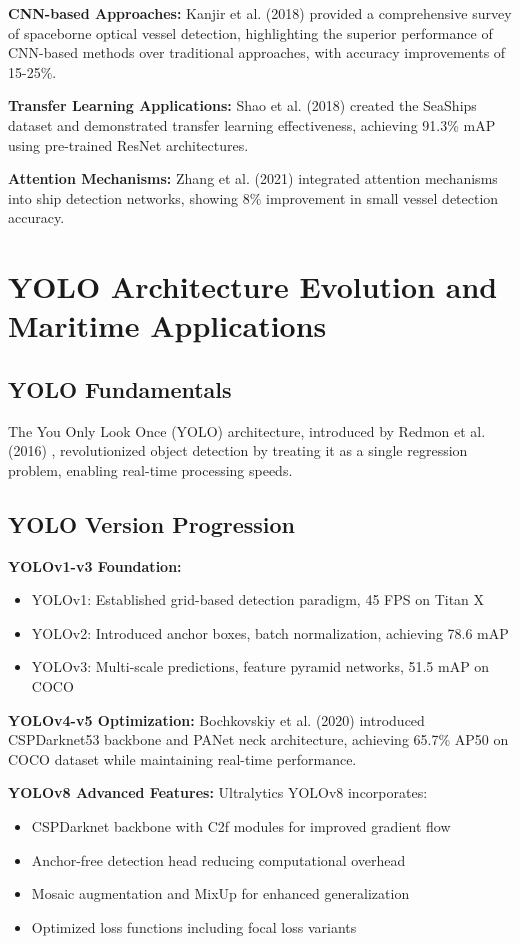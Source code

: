 \documentclass[12pt,a4paper]{report}
\begin{document}
\textbf{CNN-based Approaches:} Kanjir et al. (2018) \cite{kanjir2018vessel} provided a comprehensive survey of spaceborne optical vessel detection, highlighting the superior performance of CNN-based methods over traditional approaches, with accuracy improvements of 15-25\%.

\textbf{Transfer Learning Applications:} Shao et al. (2018) \cite{shao2018seaships} created the SeaShips dataset and demonstrated transfer learning effectiveness, achieving 91.3\% mAP using pre-trained ResNet architectures.

\textbf{Attention Mechanisms:} Zhang et al. (2021) \cite{zhang2021attention} integrated attention mechanisms into ship detection networks, showing 8\% improvement in small vessel detection accuracy.

\section{YOLO Architecture Evolution and Maritime Applications}

\subsection{YOLO Fundamentals}
The You Only Look Once (YOLO) architecture, introduced by Redmon et al. (2016) \cite{yolo_original}, revolutionized object detection by treating it as a single regression problem, enabling real-time processing speeds.

\subsection{YOLO Version Progression}

\textbf{YOLOv1-v3 Foundation:} 
\begin{itemize}
    \item YOLOv1: Established grid-based detection paradigm, 45 FPS on Titan X
    \item YOLOv2: Introduced anchor boxes, batch normalization, achieving 78.6 mAP
    \item YOLOv3: Multi-scale predictions, feature pyramid networks, 51.5 mAP on COCO
\end{itemize}

\textbf{YOLOv4-v5 Optimization:}
Bochkovskiy et al. (2020) \cite{bochkovskiy2020yolov4} introduced CSPDarknet53 backbone and PANet neck architecture, achieving 65.7\% AP50 on COCO dataset while maintaining real-time performance.

\textbf{YOLOv8 Advanced Features:}
Ultralytics YOLOv8 \cite{yolov8} incorporates:
\begin{itemize}
    \item CSPDarknet backbone with C2f modules for improved gradient flow
    \item Anchor-free detection head reducing computational overhead
    \item Mosaic augmentation and MixUp for enhanced generalization
    \item Optimized loss functions including focal loss variants
\end{itemize}
\end{document}
